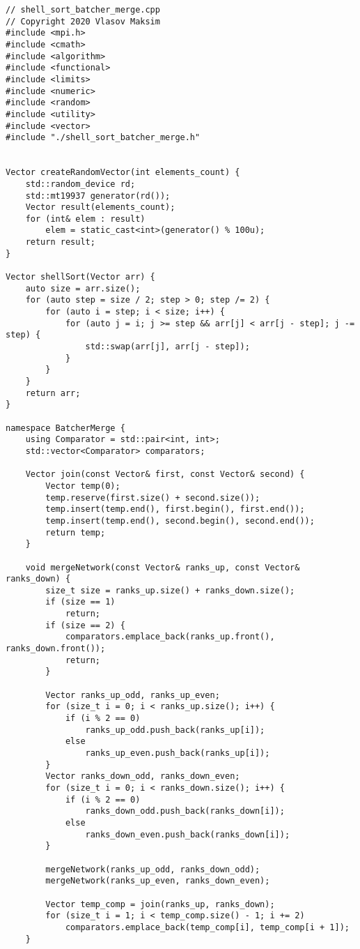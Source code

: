 \documentclass{report}
\begin{document}
\begin{lstlisting}
// shell_sort_batcher_merge.cpp
// Copyright 2020 Vlasov Maksim
#include <mpi.h>
#include <cmath>
#include <algorithm>
#include <functional>
#include <limits>
#include <numeric>
#include <random>
#include <utility>
#include <vector>
#include "./shell_sort_batcher_merge.h"


Vector createRandomVector(int elements_count) {
    std::random_device rd;
    std::mt19937 generator(rd());
    Vector result(elements_count);
    for (int& elem : result)
        elem = static_cast<int>(generator() % 100u);
    return result;
}

Vector shellSort(Vector arr) {
    auto size = arr.size();
    for (auto step = size / 2; step > 0; step /= 2) {
        for (auto i = step; i < size; i++) {
            for (auto j = i; j >= step && arr[j] < arr[j - step]; j -= step) {
                std::swap(arr[j], arr[j - step]);
            }
        }
    }
    return arr;
}

namespace BatcherMerge {
    using Comparator = std::pair<int, int>;
    std::vector<Comparator> comparators;

    Vector join(const Vector& first, const Vector& second) {
        Vector temp(0);
        temp.reserve(first.size() + second.size());
        temp.insert(temp.end(), first.begin(), first.end());
        temp.insert(temp.end(), second.begin(), second.end());
        return temp;
    }

    void mergeNetwork(const Vector& ranks_up, const Vector& ranks_down) {
        size_t size = ranks_up.size() + ranks_down.size();
        if (size == 1)
            return;
        if (size == 2) {
            comparators.emplace_back(ranks_up.front(), ranks_down.front());
            return;
        }

        Vector ranks_up_odd, ranks_up_even;
        for (size_t i = 0; i < ranks_up.size(); i++) {
            if (i % 2 == 0)
                ranks_up_odd.push_back(ranks_up[i]);
            else
                ranks_up_even.push_back(ranks_up[i]);
        }
        Vector ranks_down_odd, ranks_down_even;
        for (size_t i = 0; i < ranks_down.size(); i++) {
            if (i % 2 == 0)
                ranks_down_odd.push_back(ranks_down[i]);
            else
                ranks_down_even.push_back(ranks_down[i]);
        }

        mergeNetwork(ranks_up_odd, ranks_down_odd);
        mergeNetwork(ranks_up_even, ranks_down_even);

        Vector temp_comp = join(ranks_up, ranks_down);
        for (size_t i = 1; i < temp_comp.size() - 1; i += 2)
            comparators.emplace_back(temp_comp[i], temp_comp[i + 1]);
    }


\end{lstlisting}
\end{document}
